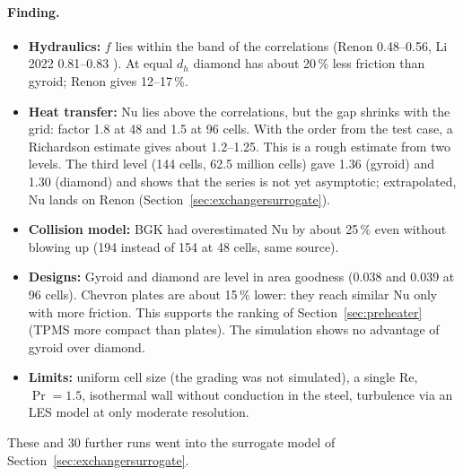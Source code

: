 \paragraph{Finding.}
\begin{itemize}
\item \textbf{Hydraulics:} $f$ lies within the band of the correlations (Renon 0.48--0.56, Li 2022 0.81--0.83
  \cite{renon2024,alsafadi2026}). At equal $d_h$ diamond has about 20\,\% less friction than gyroid; Renon gives
  12--17\,\%.
\item \textbf{Heat transfer:} Nu lies above the correlations, but the gap shrinks with the grid: factor 1.8 at 48
  and 1.5 at 96 cells. With the order from the test case, a Richardson estimate gives about 1.2--1.25. This is a rough
  estimate from two levels. The third level (144 cells, 62.5 million cells) gave 1.36 (gyroid) and 1.30 (diamond) and
  shows that the series is not yet asymptotic; extrapolated, Nu lands on Renon (Section~\ref{sec:exchangersurrogate}).
\item \textbf{Collision model:} BGK had overestimated Nu by about 25\,\% even without blowing up (194 instead of 154
  at 48 cells, same source).
\item \textbf{Designs:} Gyroid and diamond are level in area goodness (0.038 and 0.039 at 96 cells). Chevron plates
  are about 15\,\% lower: they reach similar Nu only with more friction. This supports the ranking of
  Section~\ref{sec:preheater} (TPMS more compact than plates). The simulation shows no advantage of gyroid over
  diamond.
\item \textbf{Limits:} uniform cell size (the grading was not simulated), a single Re, $\Pr = 1.5$, isothermal wall
  without conduction in the steel, turbulence via an LES model at only moderate resolution.
\end{itemize}



These and 30 further runs went into the surrogate model of Section~\ref{sec:exchangersurrogate}.
